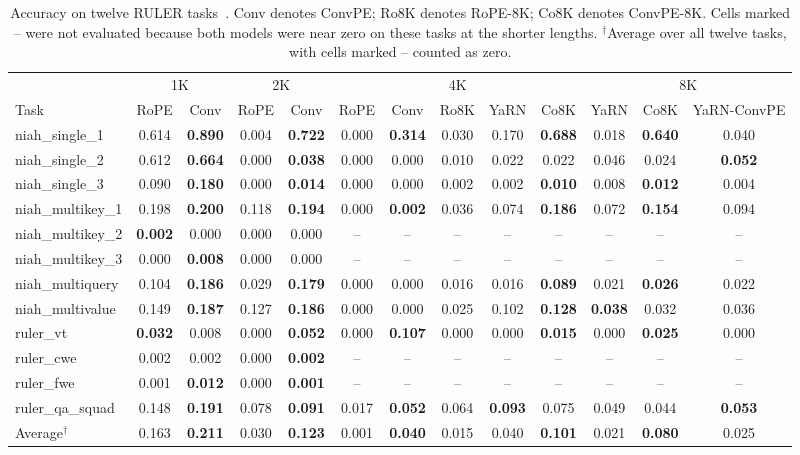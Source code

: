 \documentclass{article}
\begin{document}
\begin{table}[!ht]
\centering
\small
\setlength{\tabcolsep}{4pt}
\begin{tabular}{lcccccccccccc}
\toprule
& \multicolumn{2}{c}{1K} & \multicolumn{2}{c}{2K} & \multicolumn{5}{c}{4K} & \multicolumn{3}{c}{8K}\\
\cmidrule(lr){2-3}\cmidrule(lr){4-5}\cmidrule(lr){6-10}\cmidrule(lr){11-13}
Task & RoPE & Conv & RoPE & Conv & RoPE & Conv & Ro8K & YaRN &Co8K & YaRN &Co8K & YaRN-ConvPE \\
\midrule
niah\_single\_1   & 0.614 & \textbf{0.890} & 0.004 & \textbf{0.722} & 0.000 & \textbf{0.314} & 0.030 & 0.170 & \textbf{0.688} & 0.018 & \textbf{0.640} & 0.040 \\
niah\_single\_2   & 0.612 & \textbf{0.664} & 0.000 & \textbf{0.038} & 0.000 & 0.000 & 0.010 & 0.022 & 0.022 & 0.046 & 0.024 & \textbf{0.052} \\
niah\_single\_3   & 0.090 & \textbf{0.180} & 0.000 & \textbf{0.014} & 0.000 & 0.000 & 0.002 & 0.002 & \textbf{0.010} & 0.008 & \textbf{0.012} & 0.004 \\
niah\_multikey\_1 & 0.198 & \textbf{0.200} & 0.118 & \textbf{0.194} & 0.000 & \textbf{0.002} & 0.036 & 0.074 & \textbf{0.186} & 0.072 & \textbf{0.154} & 0.094 \\
niah\_multikey\_2 & \textbf{0.002} & 0.000 & 0.000 & 0.000 & -- & -- & -- & -- & -- & -- & -- & -- \\
niah\_multikey\_3 & 0.000 & \textbf{0.008} & 0.000 & 0.000 & -- & -- & -- & -- & -- & -- & -- & -- \\
niah\_multiquery & 0.104 & \textbf{0.186} & 0.029 & \textbf{0.179} & 0.000 & 0.000 & 0.016 & 0.016 & \textbf{0.089} & 0.021 & \textbf{0.026} & 0.022 \\
niah\_multivalue & 0.149 & \textbf{0.187} & 0.127 & \textbf{0.186} & 0.000 & 0.000 & 0.025 & 0.102 & \textbf{0.128} & \textbf{0.038} & 0.032 & 0.036 \\
ruler\_vt        & \textbf{0.032} & 0.008 & 0.000 & \textbf{0.052} & 0.000 & \textbf{0.107} & 0.000 & 0.000 & \textbf{0.015} & 0.000 & \textbf{0.025} & 0.000 \\
ruler\_cwe       & 0.002 & 0.002 & 0.000 & \textbf{0.002} & -- & -- & -- & -- & -- & -- & -- & -- \\
ruler\_fwe       & 0.001 & \textbf{0.012} & 0.000 & \textbf{0.001} & -- & -- & -- & -- & -- & -- & -- & -- \\
ruler\_qa\_squad & 0.148 & \textbf{0.191} & 0.078 & \textbf{0.091} & 0.017 & \textbf{0.052} & 0.064 & \textbf{0.093} & 0.075 & 0.049 & 0.044 & \textbf{0.053} \\
\midrule
Average$^\dagger$ & 0.163 & \textbf{0.211} & 0.030 & \textbf{0.123} & 0.001 & \textbf{0.040} & 0.015 & 0.040 & \textbf{0.101} & 0.021 & \textbf{0.080} & 0.025\\ 
\bottomrule
\end{tabular}
\caption{Accuracy on twelve RULER tasks~\cite{hsieh2024ruler}. Conv denotes ConvPE; Ro8K denotes RoPE-8K; Co8K denotes ConvPE-8K. Cells marked -- were not evaluated because both models were near zero on these tasks at the shorter lengths. $^\dagger$Average over all twelve tasks, with cells marked -- counted as zero.}
\label{tab:ruler}
\end{table}
\end{document}
